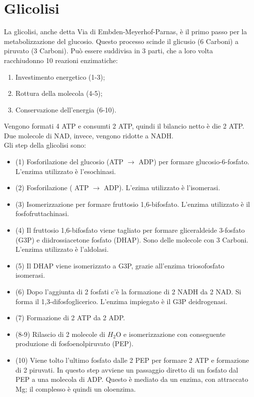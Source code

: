 \section{Glicolisi}
La glicolisi, anche detta Via di Embden-Meyerhof-Parnas, \`e il primo passo per la metabolizzazione del glucosio. Questo processo scinde il glicusio (6 Carboni) a piruvato (3 Carboni). Pu\`o essere suddivisa in 3 parti, che a loro volta racchiudonno 10 reazioni enzimatiche:
\begin{enumerate}
    \item Investimento energetico (1-3);
    \item Rottura della molecola (4-5);
    \item Conservazione dell'energia (6-10).
\end{enumerate}
Vengono formati 4 ATP e consumti 2 ATP, quindi il bilancio netto \`e die 2 ATP. Due molecole di NAD\ap{+}, invece, vengono ridotte a NADH.
\\Gli step della glicolisi sono:
\begin{itemize}
    \item (1) Fosforilazione del glucosio (ATP $\xrightarrow{}$ ADP) per formare glucosio-6-fosfato. L'enzima utilizzato \`e l'esochinasi.
    \item (2) Fosforilazione ( ATP $\xrightarrow{}$ ADP). L'ezima utilizzato \`e l'isomerasi.
    \item (3) Isomerizzazione per formare fruttosio 1,6-bifosfato. L'enzima utilizzato \`e il fosfofruttachinasi.
    \item (4) Il fruttosio 1,6-bifosfato viene tagliato per formare gliceraldeide 3-fosfato (G3P) e diidrossiacetone fosfato (DHAP). Sono delle molecole con 3 Carboni. L'enzima utilizzato \`e l'aldolasi.
    \item (5) Il DHAP viene isomerizzato a G3P, grazie all'enzima triosofosfato isomerasi.
    \item (6) Dopo l'aggiunta di 2 fosfati c'è la formazione di 2 NADH da 2 NAD\ap{+}. Si forma il 1,3-difosfoglicerico. L'enzima impiegato \`e il G3P deidrogenasi.
    \item (7) Formazione di 2 ATP da 2 ADP.
    \item (8-9) Rilascio di 2 molecole di $H_2$O e isomerizzazione con conseguente produzione di fosfoenolpiruvato (PEP).
    \item (10) Viene tolto l'ultimo fosfato dalle 2 PEP per formare 2 ATP e formazione di 2 piruvati. In questo step avviene un passaggio diretto di un fosfato dal PEP a una molecola di ADP. Questo \`e mediato da un enzima, con attraccato Mg; il complesso \`e quindi un oloenzima.
\end{itemize}
